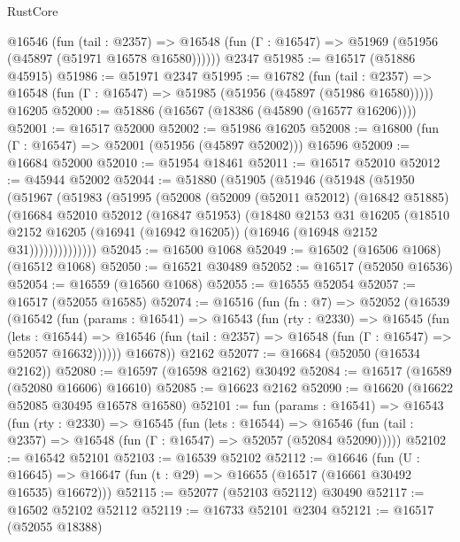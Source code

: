 \begin{lexlean}{RustCore}
\begin{coremodule}
    @16546
      (fun (tail : @2357) =>
      @16548 (fun (Γ : @16547) => @51969 (@51956 (@45897 (@51971 @16578 @16580))))))
    @2347
@51985 := @16517 (@51886 @45915)
@51986 := @51971 @2347
@51995 := @16782
    (fun (tail : @2357) => @16548 (fun (Γ : @16547) => @51985 (@51956 (@45897 (@51986 @16580)))))
    @16205
@52000 := @51886 (@16567 (@18386 (@45890 (@16577 @16206))))
@52001 := @16517 @52000
@52002 := @51986 @16205
@52008 := @16800 (fun (Γ : @16547) => @52001 (@51956 (@45897 @52002))) @16596
@52009 := @16684 @52000
@52010 := @51954 @18461
@52011 := @16517 @52010
@52012 := @45944 @52002
@52044 := @51880
    (@51905
      (@51946
        (@51948
          (@51950
            (@51967
              (@51983
                (@51995
                  (@52008
                    (@52009
                      (@52011 @52012)
                      (@16842 @51885)
                      (@16684
                        @52010
                        @52012
                        (@16847 @51953)
                        (@18480
                          @2153
                          @31
                          @16205
                          (@18510
                            @2152
                            @16205
                            (@16941 (@16942 @16205))
                            (@16946 (@16948 @2152 @31))))))))))))))
@52045 := @16500 @1068
@52049 := @16502 (@16506 @1068) (@16512 @1068)
@52050 := @16521 @30489
@52052 := @16517 (@52050 @16536)
@52054 := @16559 (@16560 @1068)
@52055 := @16555 @52054
@52057 := @16517 (@52055 @16585)
@52074 := @16516
    (fun (fn : @7) =>
    @52052
      (@16539
        (@16542
          (fun (params : @16541) =>
          @16543
            (fun (rty : @2330) =>
            @16545
              (fun (lets : @16544) =>
              @16546 (fun (tail : @2357) => @16548 (fun (Γ : @16547) => @52057 @16632))))))
        @16678))
    @2162
@52077 := @16684 (@52050 (@16534 @2162))
@52080 := @16597 (@16598 @2162) @30492
@52084 := @16517 (@16589 (@52080 @16606) @16610)
@52085 := @16623 @2162
@52090 := @16620 (@16622 @52085 @30495 @16578 @16580)
@52101 := fun (params : @16541) =>
  @16543
    (fun (rty : @2330) =>
    @16545
      (fun (lets : @16544) =>
      @16546 (fun (tail : @2357) => @16548 (fun (Γ : @16547) => @52057 (@52084 @52090)))))
@52102 := @16542 @52101
@52103 := @16539 @52102
@52112 := @16646
    (fun (U : @16645) => @16647 (fun (t : @29) => @16655 (@16517 (@16661 @30492 @16535) @16672)))
@52115 := @52077 (@52103 @52112) @30490
@52117 := @16502 @52102 @52112
@52119 := @16733 @52101 @2304
@52121 := @16517 (@52055 @18388)

\end{coremodule}
\end{lexlean}
